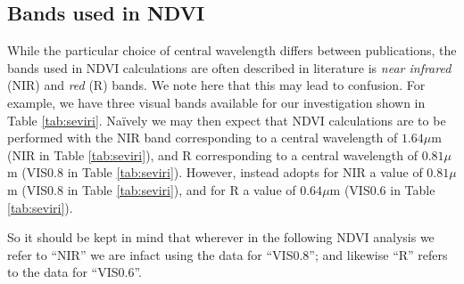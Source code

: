\subsection{Bands used in NDVI}

While the particular choice of central wavelength differs between
publications, the bands used in NDVI calculations are often described
in literature is \emph{near infrared} (NIR) and \emph{red} (R)
bands. We note here that this may lead to confusion. For example, we
have three visual bands available for our investigation shown in Table
\ref{tab:seviri}. Na{\"i}vely we may then expect that NDVI
calculations are to be performed with the NIR band corresponding to a
central wavelength of $1.64\mu$m (NIR in Table \ref{tab:seviri}), and R
corresponding to a central wavelength of $0.81\mu$m (VIS0.8 in Table
\ref{tab:seviri}). However, \cite{msgndvi2015} instead adopts for NIR
a value of $0.81\mu$m (VIS0.8 in Table \ref{tab:seviri}), and for R a
value of $0.64\mu$m (VIS0.6 in Table \ref{tab:seviri}).

So it should be kept in mind that wherever in the following NDVI
analysis we refer to ``NIR'' we are infact using the data for
``VIS0.8''; and likewise ``R'' refers to the data for ``VIS0.6''.
